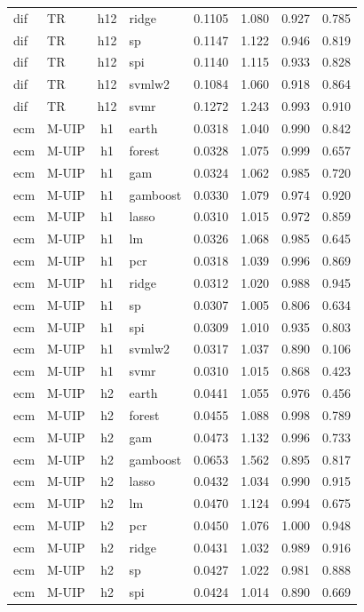 \begin{ThreePartTable}
\begin{longtable}[t]{llclcccc}
dif & TR & h12 & ridge & 0.1105 & 1.080 & 0.927 & 0.785\\
dif & TR & h12 & sp & 0.1147 & 1.122 & 0.946 & 0.819\\
dif & TR & h12 & spi & 0.1140 & 1.115 & 0.933 & 0.828\\
dif & TR & h12 & svmlw2 & 0.1084 & 1.060 & 0.918 & 0.864\\
dif & TR & h12 & svmr & 0.1272 & 1.243 & 0.993 & 0.910\\
\addlinespace
ecm & M-UIP & h1 & earth & 0.0318 & 1.040 & 0.990 & 0.842\\
ecm & M-UIP & h1 & forest & 0.0328 & 1.075 & 0.999 & 0.657\\
ecm & M-UIP & h1 & gam & 0.0324 & 1.062 & 0.985 & 0.720\\
ecm & M-UIP & h1 & gamboost & 0.0330 & 1.079 & 0.974 & 0.920\\
ecm & M-UIP & h1 & lasso & 0.0310 & 1.015 & 0.972 & 0.859\\
ecm & M-UIP & h1 & lm & 0.0326 & 1.068 & 0.985 & 0.645\\
ecm & M-UIP & h1 & pcr & 0.0318 & 1.039 & 0.996 & 0.869\\
ecm & M-UIP & h1 & ridge & 0.0312 & 1.020 & 0.988 & 0.945\\
ecm & M-UIP & h1 & sp & 0.0307 & 1.005 & 0.806 & 0.634\\
ecm & M-UIP & h1 & spi & 0.0309 & 1.010 & 0.935 & 0.803\\
ecm & M-UIP & h1 & svmlw2 & 0.0317 & 1.037 & 0.890 & 0.106\\
ecm & M-UIP & h1 & svmr & 0.0310 & 1.015 & 0.868 & 0.423\\
\addlinespace
ecm & M-UIP & h2 & earth & 0.0441 & 1.055 & 0.976 & 0.456\\
ecm & M-UIP & h2 & forest & 0.0455 & 1.088 & 0.998 & 0.789\\
ecm & M-UIP & h2 & gam & 0.0473 & 1.132 & 0.996 & 0.733\\
ecm & M-UIP & h2 & gamboost & 0.0653 & 1.562 & 0.895 & 0.817\\
ecm & M-UIP & h2 & lasso & 0.0432 & 1.034 & 0.990 & 0.915\\
ecm & M-UIP & h2 & lm & 0.0470 & 1.124 & 0.994 & 0.675\\
ecm & M-UIP & h2 & pcr & 0.0450 & 1.076 & 1.000 & 0.948\\
ecm & M-UIP & h2 & ridge & 0.0431 & 1.032 & 0.989 & 0.916\\
ecm & M-UIP & h2 & sp & 0.0427 & 1.022 & 0.981 & 0.888\\
ecm & M-UIP & h2 & spi & 0.0424 & 1.014 & 0.890 & 0.669\\

\end{longtable}
\end{ThreePartTable}

